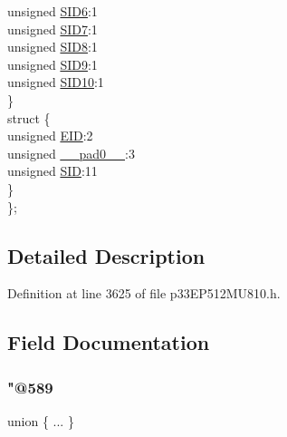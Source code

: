 \begin{DoxyCompactItemize}
\begin{tabbing}
\>\>unsigned \hyperlink{structtag_c1_r_x_m2_s_i_d_b_i_t_s_a70d70952133eb2389d5c326f9f0e8035}{SID6}:1\\
\>\>unsigned \hyperlink{structtag_c1_r_x_m2_s_i_d_b_i_t_s_a34097fb76decd431701fa2d86a22328e}{SID7}:1\\
\>\>unsigned \hyperlink{structtag_c1_r_x_m2_s_i_d_b_i_t_s_afe74894633244fdb0b0c01b4e8c522e7}{SID8}:1\\
\>\>unsigned \hyperlink{structtag_c1_r_x_m2_s_i_d_b_i_t_s_a33587704948067005c2a6a3ccc503c99}{SID9}:1\\
\>\>unsigned \hyperlink{structtag_c1_r_x_m2_s_i_d_b_i_t_s_a1a9084031c7f5fb16007feeebf0d8216}{SID10}:1\\
\>\} \\
\>struct \{\\
\>\>unsigned \hyperlink{structtag_c1_r_x_m2_s_i_d_b_i_t_s_ae80b378c9141f7c03e0b4e55b5f4b54d}{EID}:2\\
\>\>unsigned \hyperlink{structtag_c1_r_x_m2_s_i_d_b_i_t_s_adf71f3d8410c1f1dbbc96680a92c49af}{\_\_pad0\_\_}:3\\
\>\>unsigned \hyperlink{structtag_c1_r_x_m2_s_i_d_b_i_t_s_af88edf93b2fee2432665bd84f51287e4}{SID}:11\\
\>\} \\
\}; \\

\end{tabbing}\end{DoxyCompactItemize}


\subsection{Detailed Description}


Definition at line 3625 of file p33\+E\+P512\+M\+U810.\+h.



\subsection{Field Documentation}
\mbox{\label{structtag_c1_r_x_m2_s_i_d_b_i_t_s_a90b0716cdfb2bb169961c3872b1e6261}} 
\subsubsection{\texorpdfstring{"@589}{@589}}
{\footnotesize\ttfamily union \{ ... \} }

\mbox{\label{structtag_c1_r_x_m2_s_i_d_b_i_t_s_adf71f3d8410c1f1dbbc96680a92c49af}} 
